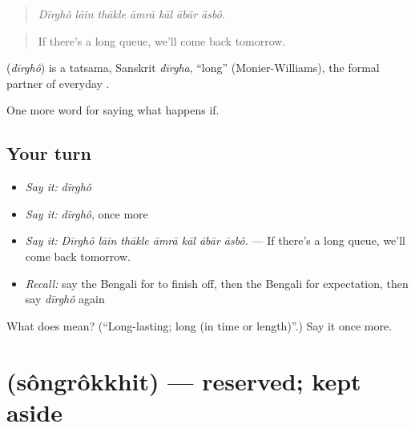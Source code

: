 \begin{quote}
      
\end{quote}

\begin{quote}
\emph{Dīrghô lāin thākle āmrā kāl ābār āsbô.}
\end{quote}

\begin{quote}
If there's a long queue, we'll come back tomorrow.
\end{quote}

\begin{cousinweb}
\textbf{} (\emph{dīrghô}) is a tatsama, Sanskrit \emph{dīrgha}, \textquotedblleft{}long\textquotedblright{} (Monier-Williams), the formal partner of everyday .
\end{cousinweb}

\begin{grammarlens}[title={What you've built}]
One more word for saying what happens if.
\end{grammarlens}

\subsection*{Your turn}
\begin{itemize}
\raggedright
  \item \emph{Say it:} \emph{dīrghô}
  \item \emph{Say it:} \emph{dīrghô}, once more
  \item \emph{Say it:} \emph{Dīrghô lāin thākle āmrā kāl ābār āsbô.} — If there's a long queue, we'll come back tomorrow.
  \item \emph{Recall:} say the Bengali for to finish off, then the Bengali for expectation, then say \emph{dīrghô} again
\end{itemize}

\begin{tcolorbox}[breakable,colback=teal!4,colframe=teal!35!black,title={Before you move on}]
What does  mean? (\textquotedblleft{}Long-lasting; long (in time or length)\textquotedblright{}.) Say it once more.
\end{tcolorbox}
\section[\texorpdfstring{\bn{সংরক্ষিত} (sôngrôkkhit)}{সংরক্ষিত (sôngrôkkhit)}]{ (sôngrôkkhit) — reserved; kept aside}

